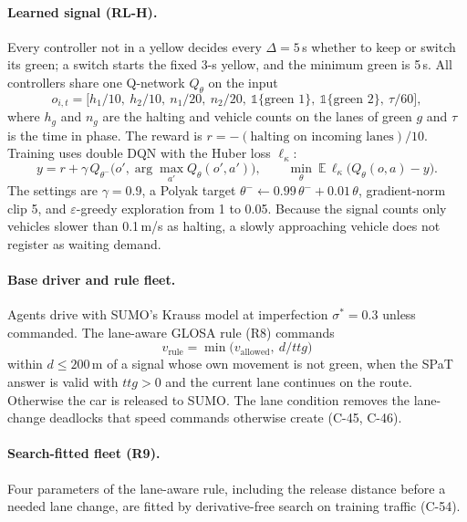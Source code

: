 \documentclass[11pt]{article}
\begin{document}
\paragraph{Learned signal (RL-H).} Every controller not in a yellow decides every $\Delta=5$\,s whether to keep or switch its green; a
switch starts the fixed 3-s yellow, and the minimum green is 5\,s. All controllers share one Q-network $Q_\theta$ on the input
\begin{equation}
o_{i,t}=\big[h_1/10,\ h_2/10,\ n_1/20,\ n_2/20,\ \mathbb 1\{\text{green }1\},\ \mathbb 1\{\text{green }2\},\ \tau/60\big],
\end{equation}
where $h_g$ and $n_g$ are the halting and vehicle counts on the lanes of green $g$ and $\tau$ is the time in phase. The reward is
$r=-(\text{halting on incoming lanes})/10$. Training uses double DQN with the Huber loss $\ell_\kappa$:
\begin{equation}
y=r+\gamma\,Q_{\theta^-}\!\big(o',\arg\max_{a'}Q_\theta(o',a')\big),\qquad \min_\theta\ \mathbb E\,\ell_\kappa\big(Q_\theta(o,a)-y\big).
\end{equation}
The settings are $\gamma=0.9$, a Polyak target $\theta^-\leftarrow0.99\,\theta^-+0.01\,\theta$, gradient-norm clip 5, and $\varepsilon$-greedy
exploration from 1 to 0.05. Because the signal counts only vehicles slower than 0.1\,m/s as halting, a slowly approaching vehicle does not
register as waiting demand.
\paragraph{Base driver and rule fleet.} Agents drive with SUMO's Krauss model at imperfection $\sigma^*=0.3$ unless commanded. The
lane-aware GLOSA rule (R8) commands
\begin{equation}
v_{\mathrm{rule}}=\min\big(v_{\mathrm{allowed}},\ d/\mathit{ttg}\big)
\end{equation}
within $d\le200$\,m of a signal whose own movement is not green, when the SPaT answer is valid with $\mathit{ttg}>0$ and the current lane
continues on the route. Otherwise the car is released to SUMO. The lane condition removes the lane-change deadlocks that speed commands
otherwise create (C-45, C-46).
\paragraph{Search-fitted fleet (R9).} Four parameters of the lane-aware rule, including the release distance before a needed lane change,
are fitted by derivative-free search on training traffic (C-54).
\end{document}
